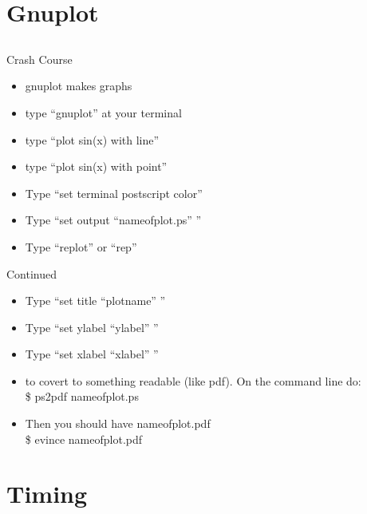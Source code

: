 \documentclass{beamer}
\begin{document}
\section{Gnuplot}
\subsection{}

\begin{frame}{Crash Course}
\begin{itemize}
\item gnuplot makes graphs
\item type ``gnuplot'' at your terminal 
\item type ``plot sin(x) with line''
\item type ``plot sin(x) with point''

\item Type ``set terminal postscript color''
\item Type ``set output ``nameofplot.ps'' ''
\item Type ``replot'' or ``rep''
\end{itemize}
\end{frame}

\begin{frame}{Continued}
\begin{itemize}
\item Type ``set title ``plotname'' ''
\item Type ``set ylabel ``ylabel'' ''                                    
\item Type ``set xlabel ``xlabel'' ''

\item to covert to something readable (like pdf).  On the command line do:\\
\$ ps2pdf nameofplot.ps
\item Then you should have nameofplot.pdf \\
\$ evince nameofplot.pdf
\end{itemize}
\end{frame}

\section{Timing}
\subsection{}
\end{document}
